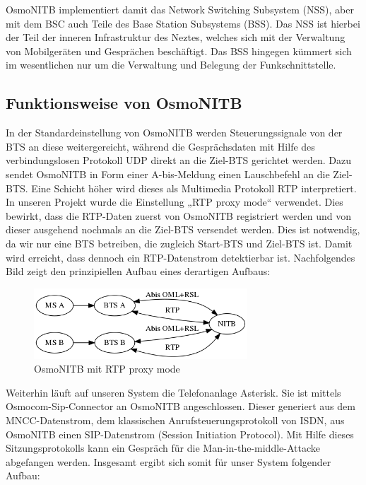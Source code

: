 OsmoNITB implementiert damit das Network Switching Subsystem (NSS), aber mit dem BSC auch Teile des Base Station Subsystems (BSS). Das NSS ist hierbei der Teil der inneren Infrastruktur des Neztes, welches sich mit der Verwaltung von Mobilgeräten und Gesprächen beschäftigt. Das BSS hingegen kümmert sich im wesentlichen nur um die Verwaltung und Belegung der Funkschnittstelle.


\subsection{Funktionsweise von OsmoNITB}

In der Standardeinstellung von OsmoNITB werden Steuerungssignale von der BTS an diese weitergereicht, während die Gesprächsdaten mit Hilfe des verbindungslosen Protokoll UDP direkt an die Ziel-BTS gerichtet werden. Dazu sendet OsmoNITB in Form einer A-bis-Meldung einen Lauschbefehl an die Ziel-BTS. Eine Schicht höher wird dieses als Multimedia Protokoll RTP interpretiert. In unseren Projekt wurde die Einstellung „RTP proxy mode“ verwendet. Dies bewirkt, dass die RTP-Daten zuerst von OsmoNITB registriert werden und von dieser ausgehend nochmals an die Ziel-BTS versendet werden. Dies ist notwendig, da wir nur eine BTS betreiben, die zugleich Start-BTS und Ziel-BTS ist. Damit wird erreicht, dass dennoch ein RTP-Datenstrom detektierbar ist. Nachfolgendes Bild zeigt den prinzipiellen Aufbau eines derartigen Aufbaus:



\begin{figure}[h]
    \centering
    \includegraphics[width=8cm]{includes/osmonitb_rtp_proxy}
    \caption{OsmoNITB mit RTP proxy mode}
	\label{fig:osmonitb2}
\end{figure}


Weiterhin läuft auf unseren System die Telefonanlage Asterisk. Sie ist mittels Osmocom-Sip-Connector an OsmoNITB angeschlossen. Dieser generiert aus dem MNCC-Datenstrom, dem klassischen Anrufsteuerungsprotokoll von ISDN, aus OsmoNITB einen SIP-Datenstrom (Session Initiation Protocol). Mit Hilfe dieses Sitzungsprotokolls kann ein Gespräch für die Man-in-the-middle-Attacke abgefangen werden. Insgesamt ergibt sich somit für unser System folgender Aufbau:



